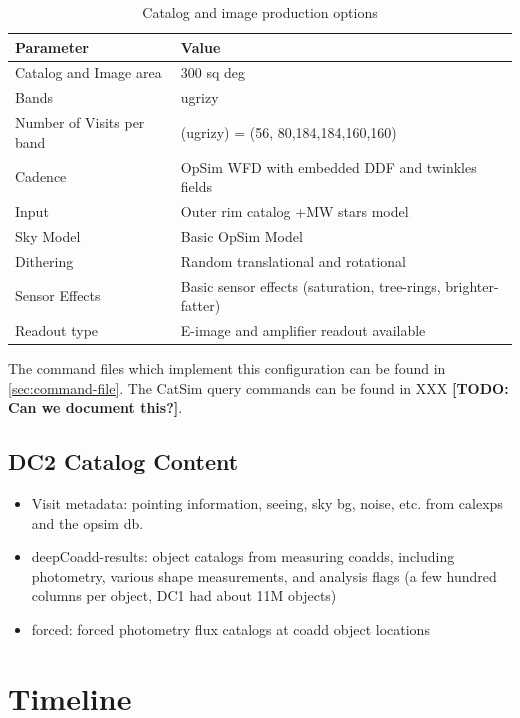 \documentclass[preprint,times]{aastex61}
\newcommand*{\note}[1]{\textbf{[#1]}}
\newcommand*{\todo}[1]{\note{TODO: #1}}
\begin{document}
\begin{table}[!htb]
  \centering
   \caption{Catalog and image production options}
  \label{tab:image-options-2}
  \begin{tabular}{| l| l| }
    \hline 
    Parameter                       & Value   \\
    \hline
    Catalog and Image area  & 300 sq deg \\
    Bands                             & ugrizy   \\
    Number of Visits per band  &  (ugrizy) = (56, 80,184,184,160,160) \\
    Cadence                         & OpSim WFD with embedded DDF and twinkles fields\\
    Input                              & Outer rim catalog +MW stars model \\
    Sky Model                      & Basic OpSim Model \\
    Dithering                       & Random translational and rotational  \\
    Sensor Effects                & Basic sensor effects (saturation, tree-rings, brighter-fatter) \\
    Readout type                 & E-image and amplifier readout available \\
    \hline
  \end{tabular}
\end{table}

The command files which implement this configuration can be found in
\autoref{sec:command-file}.  The CatSim query commands can be
found in XXX \todo{Can we document this?}.

\subsection{DC2 Catalog Content}
\begin{itemize}
\item Visit metadata: pointing information, seeing, sky bg, noise, etc. from calexps and the opsim db.
\item deepCoadd-results: object catalogs from measuring coadds, including photometry, various shape measurements, and analysis flags (a few hundred columns per object, DC1 had about 11M objects)
\item forced: forced photometry flux catalogs at coadd object locations 
\end{itemize}



\section{Timeline}
\label{sec:timeline}
\end{document}
